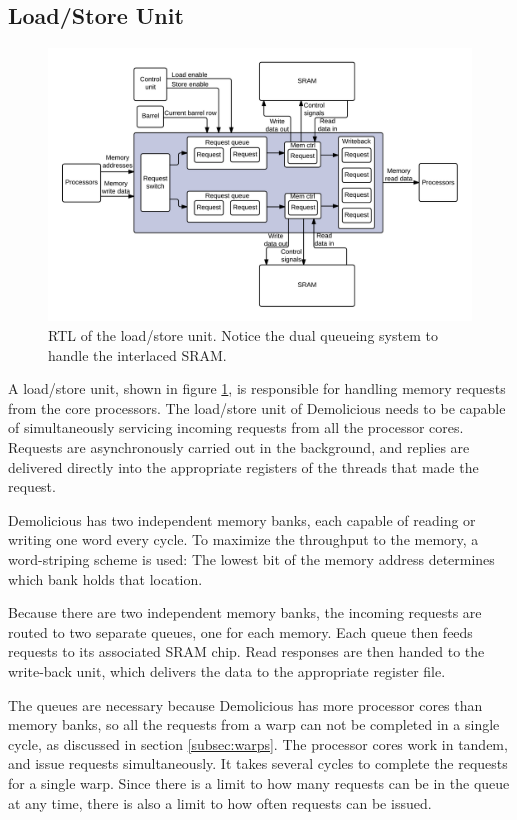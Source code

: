 \subsection{Load/Store Unit}

\begin{figure}[H]
	\centering
	\includegraphics[width=\textwidth]{../gpu/diagrams/lsu.png}
	\caption{RTL of the load/store unit. Notice the dual queueing system to handle the interlaced SRAM.}
	\label{fig:lsu}
\end{figure}

A load/store unit, shown in figure \ref{fig:lsu}, is responsible for handling memory requests from the core processors.
The load/store unit of Demolicious needs to be capable of simultaneously servicing incoming requests from all the processor cores.
Requests are asynchronously carried out in the background, and replies are delivered directly into the appropriate registers of the threads that made the request.

Demolicious has two independent memory banks, each capable of reading or writing one word every cycle.
To maximize the throughput to the memory, a word-striping scheme is used:
The lowest bit of the memory address determines which bank holds that location.

Because there are two independent memory banks, the incoming requests are routed to two separate queues, one for each memory.
Each queue then feeds requests to its associated SRAM chip.
Read responses are then handed to the write-back unit, which delivers the data to the appropriate register file.

The queues are necessary because Demolicious has more processor cores than memory banks, so all the requests from a warp can not be completed in a single cycle, as discussed in section \ref{subsec:warps}.
The processor cores work in tandem, and issue requests simultaneously.
It takes several cycles to complete the requests for a single warp.
Since there is a limit to how many requests can be in the queue at any time, there is also a limit to how often requests can be issued.
